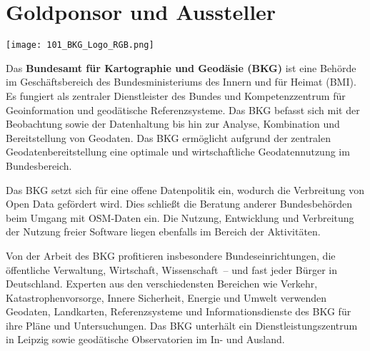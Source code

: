\section*{Goldponsor und Aussteller}
\begin{flushright}
\texttt{[image: 101\_BKG\_Logo\_RGB.png]}
\end{flushright}
\noindent
Das {\bfseries Bundesamt für Kartographie und Geodäsie (BKG)} ist eine Behörde im Geschäftsbereich des Bundesministeriums des Innern und für Heimat (BMI). Es fungiert als zentraler Dienstleister des Bundes und Kompetenzzentrum für Geoinformation und geodätische Referenzsysteme. Das BKG befasst sich mit der Beobachtung sowie der Datenhaltung bis hin zur Analyse, Kombination und Bereitstellung von Geodaten. Das BKG ermöglicht aufgrund der zentralen Geodatenbereitstellung eine optimale und wirtschaftliche Geodatennutzung im Bundesbereich.

\noindent
Das BKG setzt sich für eine offene Datenpolitik ein, wodurch die Verbreitung von Open Data gefördert wird. Dies schließt die Beratung anderer Bundesbehörden beim Umgang mit OSM-Daten ein. Die Nutzung, Entwicklung und Verbreitung der Nutzung freier Software liegen ebenfalls im Bereich der Aktivitäten.

\noindent
Von der Arbeit des BKG profitieren insbesondere Bundeseinrichtungen, die öffentliche Verwaltung, Wirtschaft, Wissenschaft~-- und fast jeder Bürger in Deutschland. Experten aus den verschiedensten Bereichen wie Verkehr, Katastrophenvorsorge, Innere Sicherheit, Energie und Umwelt verwenden Geodaten, Landkarten, Referenzsysteme und Informationsdienste des BKG für ihre Pläne und Untersuchungen. Das BKG unterhält ein Dienstleistungszentrum in Leipzig sowie geodätische Observatorien im In- und Ausland.
